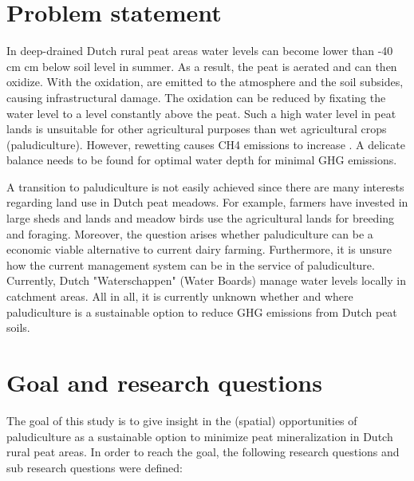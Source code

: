 \documentclass[a4paper,12pt]{scrbook}
\begin{document}
\section{Problem statement}
In deep-drained Dutch rural peat areas water levels can become lower than -40 cm cm below soil level in summer. As a result, the peat is aerated and can then oxidize. With the oxidation,  are emitted to the atmosphere and the soil subsides, causing infrastructural damage. The oxidation can be reduced by fixating the water level to a level constantly above the peat. Such a high water level in peat lands is unsuitable for other agricultural purposes than wet agricultural crops (paludiculture). However, rewetting causes CH4 emissions to increase \citep{brouns2016effects}. A delicate balance needs to be found for optimal water depth for minimal GHG emissions.

A transition to paludiculture is not easily achieved since there are many interests regarding land use in Dutch peat meadows. For example, farmers have invested in large sheds and lands and meadow birds use the agricultural lands for breeding and foraging. Moreover, the question arises whether paludiculture can be a economic viable alternative to current dairy farming. Furthermore, it is unsure how the current management system can be in the service of paludiculture. Currently, Dutch "Waterschappen" (Water Boards) manage water levels locally in catchment areas. All in all, it is currently unknown whether and where paludiculture is a sustainable option to reduce GHG emissions from Dutch peat soils. 

\section{Goal and research questions}
The goal of this study is to give insight in the (spatial) opportunities of paludiculture as a sustainable option to minimize peat mineralization in Dutch rural peat areas. In order to reach the goal, the following research questions and sub research questions were defined:
\end{document}
